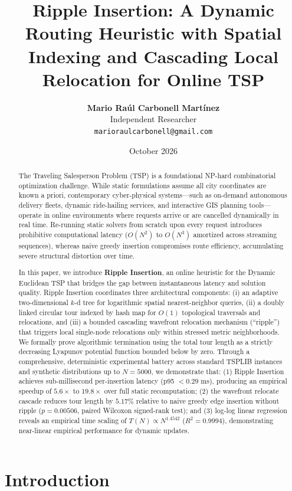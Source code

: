 \documentclass{article}
\title{\textbf{Ripple Insertion: A Dynamic Routing Heuristic with Spatial Indexing and Cascading Local Relocation for Online TSP}}
\author{
  \textbf{Mario Raúl Carbonell Martínez} \\
  Independent Researcher \\
  \texttt{marioraulcarbonell@gmail.com}
}
\date{October 2026}
\theoremstyle{definition}
\begin{document}
\maketitle

\begin{abstract}
The Traveling Salesperson Problem (TSP) is a foundational NP-hard combinatorial optimization challenge. While static formulations assume all city coordinates are known a priori, contemporary cyber-physical systems---such as on-demand autonomous delivery fleets, dynamic ride-hailing services, and interactive GIS planning tools---operate in online environments where requests arrive or are cancelled dynamically in real time. Re-running static solvers from scratch upon every request introduces prohibitive computational latency ($O(N^2)$ to $O(N^3)$ amortized across streaming sequences), whereas naive greedy insertion compromises route efficiency, accumulating severe structural distortion over time.

In this paper, we introduce \textbf{Ripple Insertion}, an online heuristic for the Dynamic Euclidean TSP that bridges the gap between instantaneous latency and solution quality. Ripple Insertion coordinates three architectural components: (i) an adaptive two-dimensional $k$-d tree for logarithmic spatial nearest-neighbor queries, (ii) a doubly linked circular tour indexed by hash map for $O(1)$ topological traversals and relocations, and (iii) a bounded cascading wavefront relocation mechanism (``ripple'') that triggers local single-node relocations only within stressed metric neighborhoods. We formally prove algorithmic termination using the total tour length as a strictly decreasing Lyapunov potential function bounded below by zero. Through a comprehensive, deterministic experimental battery across standard TSPLIB instances and synthetic distributions up to $N = 5000$, we demonstrate that: (1) Ripple Insertion achieves sub-millisecond per-insertion latency (p95 $< 0.29$ ms), producing an empirical speedup of $5.6\times$ to $19.8\times$ over full static recomputation; (2) the wavefront relocate cascade reduces tour length by $5.17\%$ relative to naive greedy edge insertion without ripple ($p = 0.00506$, paired Wilcoxon signed-rank test); and (3) log-log linear regression reveals an empirical time scaling of $T(N) \propto N^{1.4542}$ ($R^2 = 0.9994$), demonstrating near-linear empirical performance for dynamic updates.
\end{abstract}

\section{Introduction}
\end{document}
